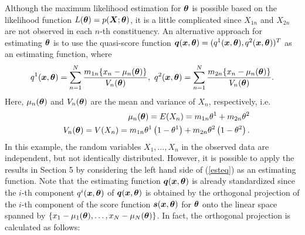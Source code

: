 \documentclass[graybox]{svmult}
\newcommand{\bm}[1]{\mbox{\boldmath $#1$}}
\begin{document}
Although the maximum likelihood estimation for $\bm{\theta}$ is possible 
based on the likelihood function $L(\bm{\theta})=p(\bm{X};\bm{\theta})$, it is a little complicated since 
$X_{1n}$ and $X_{2n}$ are not observed in each $n$-th constituency. An alternative approach for estimating 
$\bm{\theta}$ is to use the quasi-score function
$\bm{q}(\bm{x},\bm{\theta})=(q^1(\bm{x},\bm{\theta}),q^2(\bm{x},\bm{\theta}))^T$ 
\cite{MN} as an estimating function, where
%
\begin{eqnarray*}\label{conestfun}
   q^1(\bm{x},\bm{\theta}) = \sum_{n=1}^{N}\frac{m_{1n}\{x_n - \mu_n(\bm{\theta})\}}{V_n(\bm{\theta})}, \
   q^2(\bm{x},\bm{\theta}) = \sum_{n=1}^{N}\frac{m_{2n}\{x_n - \mu_n(\bm{\theta})\}}{V_n(\bm{\theta})}.
\end{eqnarray*}
%
Here, $\mu_n(\bm{\theta})$ and $V_n(\bm{\theta})$ are the mean and variance of $X_n$, respectively, i.e.
%
\begin{eqnarray}
   &&\mu_n(\bm{\theta}) = E(X_n) = m_{1n}\theta^1 + m_{2n}\theta^2 \label{mean} \\
   &&V_n(\bm{\theta}) = V(X_n) = m_{1n}\theta^1\left(1-\theta^1\right) + m_{2n}\theta^2\left(1-\theta^2\right). \nonumber
\end{eqnarray}
%
In this example, the random variables $X_1,\ldots,X_n$ in the observed data are independent, but not
identically distributed. However, it is possible to apply the results in Section 5 by considering the
left hand side of (\ref{esteq}) as an estimating function.
Note that the estimating function $\bm{q}(\bm{x},\bm{\theta})$ is already standardized since
the $i$-th component $q^i(\bm{x},\bm{\theta})$ of $\bm{q}(\bm{x},\bm{\theta})$ is obtained
by the orthogonal projection of the $i$-th component of the score function $\bm{s}(\bm{x},\bm{\theta})$ 
for $\bm{\theta}$ onto the linear space spanned by $\{x_1-\mu_1(\bm{\theta}),\ldots,x_N-\mu_N(\bm{\theta})\}$. 
In fact, the orthogonal projection is calculated as follows:
%
\end{document}
